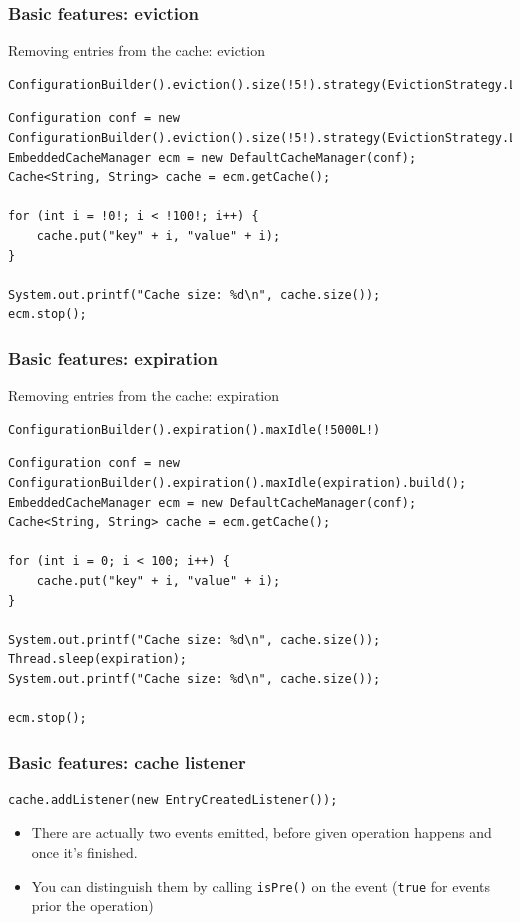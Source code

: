 \documentclass[10pt,utf8]{beamer}
\begin{document}
\begin{frame}[fragile]
	\frametitle{Basic features: eviction}
	Removing entries from the cache: eviction
	\begin{lstlisting}[style=Java]
	ConfigurationBuilder().eviction().size(!5!).strategy(EvictionStrategy.LRU)
	\end{lstlisting}
	
	\begin{lstlisting}[style=Java]
Configuration conf = new ConfigurationBuilder().eviction().size(!5!).strategy(EvictionStrategy.LIRS).build();
EmbeddedCacheManager ecm = new DefaultCacheManager(conf);
Cache<String, String> cache = ecm.getCache();

for (int i = !0!; i < !100!; i++) {
    cache.put("key" + i, "value" + i);
}

System.out.printf("Cache size: %d\n", cache.size());
ecm.stop();
	\end{lstlisting}
\end{frame}

\begin{frame}[fragile]
	\frametitle{Basic features: expiration}
	Removing entries from the cache: expiration
	\begin{lstlisting}[style=Java]
ConfigurationBuilder().expiration().maxIdle(!5000L!)
	\end{lstlisting}
	
	\begin{lstlisting}[style=Java]
Configuration conf = new ConfigurationBuilder().expiration().maxIdle(expiration).build();
EmbeddedCacheManager ecm = new DefaultCacheManager(conf);
Cache<String, String> cache = ecm.getCache();

for (int i = 0; i < 100; i++) {
    cache.put("key" + i, "value" + i);
}

System.out.printf("Cache size: %d\n", cache.size());
Thread.sleep(expiration);
System.out.printf("Cache size: %d\n", cache.size());

ecm.stop();
	\end{lstlisting}
\end{frame}

\begin{frame}[fragile]
	\frametitle{Basic features: cache listener}
	\begin{lstlisting}[style=Java]
cache.addListener(new EntryCreatedListener());
	\end{lstlisting}
	\begin{itemize}
		\item There are actually two events emitted, before given operation happens and once it's finished.
		\item You can distinguish them by calling \texttt{isPre()} on the event (\texttt{true} for events prior the operation)
	\end{itemize}
\end{frame}
\end{document}
